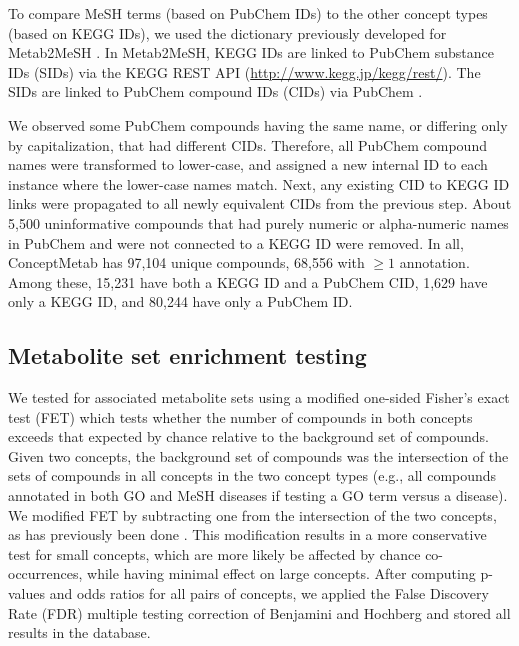To compare MeSH terms (based on PubChem IDs) to the other concept types (based on KEGG IDs), we used the dictionary previously developed for Metab2MeSH \cite{Sartor:2012eb}. In Metab2MeSH, KEGG IDs are linked to PubChem substance IDs (SIDs) via the KEGG REST API (\url{http://www.kegg.jp/kegg/rest/}). The SIDs are linked to PubChem compound IDs (CIDs) via PubChem \cite{Wang:2009cf}.

We observed some PubChem compounds having the same name, or differing only by capitalization, that had different CIDs. Therefore, all PubChem compound names were transformed to lower-case, and assigned a new internal ID to each instance where the lower-case names match. Next, any existing CID to KEGG ID links were propagated to all newly equivalent CIDs from the previous step. About 5,500 uninformative compounds that had purely numeric or alpha-numeric names in PubChem and were not connected to a KEGG ID were removed. In all, ConceptMetab has 97,104 unique compounds, 68,556 with $\geq 1$ annotation. Among these, 15,231 have both a KEGG ID and a PubChem CID, 1,629 have only a KEGG ID, and 80,244 have only a PubChem ID.

\subsection{Metabolite set enrichment testing}
\label{conceptmetab_methods_enrichment}

We tested for associated metabolite sets using a modified one-sided Fisher's exact test (FET) which tests whether the number of compounds in both concepts exceeds that expected by chance relative to the background set of compounds. Given two concepts, the background set of compounds was the intersection of the sets of compounds in all concepts in the two concept types (e.g., all compounds annotated in both GO and MeSH diseases if testing a GO term versus a disease). We modified FET by subtracting one from the intersection of the two concepts, as has previously been done \cite{Huang:2009gka, Sartor:2009fo}. This modification results in a more conservative test for small concepts, which are more likely be affected by chance co-occurrences, while having minimal effect on large concepts. After computing p-values and odds ratios for all pairs of concepts, we applied the False Discovery Rate (FDR) multiple testing correction of Benjamini and Hochberg and stored all results in the database.

